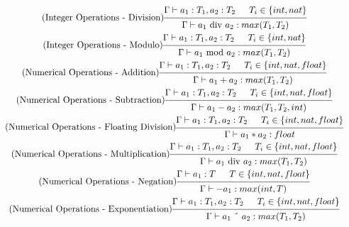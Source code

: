 \documentclass{article}
\begin{document}
\begin{gather}
\tag{Integer Operations - Division}
\begin{prooftree}
\hypo{\Gamma \vdash a_1: T_1, a_2: T_2}
\hypo{T_i \in \{int, nat\}}
\infer2{\Gamma \vdash a_1 \text{ div } a_2: max(T_1, T_2)}
\end{prooftree}
\\
\tag{Integer Operations - Modulo}
\begin{prooftree}
\hypo{\Gamma \vdash a_1: T_1, a_2: T_2}
\hypo{T_i \in \{int, nat\}}
\infer2{\Gamma \vdash a_1 \text{ mod } a_2: max(T_1, T_2)}
\end{prooftree}
\\
\tag{Numerical Operations - Addition}
\begin{prooftree}
\hypo{\Gamma \vdash a_1: T_1, a_2: T_2}
\hypo{T_i \in \{int, nat, float\}}
\infer2{\Gamma \vdash a_1 + a_2: max(T_1, T_2)}
\end{prooftree}
\\
\tag{Numerical Operations - Subtraction}
\begin{prooftree}
\hypo{\Gamma \vdash a_1: T_1, a_2: T_2}
\hypo{T_i \in \{int, nat, float\}}
\infer2{\Gamma \vdash a_1 - a_2: max(T_1, T_2, int)}
\end{prooftree}
\\
\tag{Numerical Operations - Floating Division}
\begin{prooftree}
\hypo{\Gamma \vdash a_1: T_1, a_2: T_2}
\hypo{T_i \in \{int, nat, float\}}
\infer2{\Gamma \vdash a_1 * a_2: float}
\end{prooftree}
\\
\tag{Numerical Operations - Multiplication}
\begin{prooftree}
\hypo{\Gamma \vdash a_1: T_1, a_2: T_2}
\hypo{T_i \in \{int, nat, float\}}
\infer2{\Gamma \vdash a_1 \text{ div } a_2: max(T_1, T_2)}
\end{prooftree}
\\
\tag{Numerical Operations - Negation}
\begin{prooftree}
\hypo{\Gamma \vdash a_1: T}
\hypo{T \in \{int, nat, float\}}
\infer2{\Gamma \vdash -a_1: max(int, T)}
\end{prooftree}
\\
\tag{Numerical Operations - Exponentiation}
\begin{prooftree}
\hypo{\Gamma \vdash a_1: T_1, a_2: T_2}
\hypo{T_i \in \{int, nat, float\}}
\infer2{\Gamma \vdash a_1 \text{ \^{} } a_2: max(T_1, T_2)}
\end{prooftree}
\end{gather}
\end{document}

